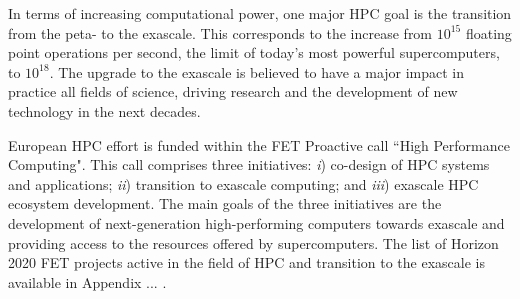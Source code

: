 In terms of increasing computational power, one major HPC goal is the transition from the peta- to the exascale. This corresponds to the increase from $10^{15}$ floating point operations per second, the limit of today's most powerful supercomputers, to $10^{18}$. The upgrade to the exascale is believed to have a major impact in practice all fields of science, driving research and the development of new technology in the next decades. 

European HPC effort is funded within the FET Proactive call ``High Performance Computing". This call comprises three initiatives: \textit{i}) co-design of HPC systems and applications; \textit{ii}) transition to exascale computing; and \textit{iii}) exascale HPC ecosystem development. The main goals of the three initiatives are the development of next-generation high-performing computers towards exascale and providing access to the resources offered by supercomputers. The list of Horizon 2020 FET projects active in the field of HPC and transition to the exascale is available in Appendix ... .
